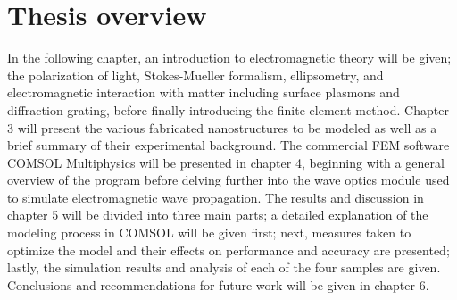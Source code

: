 





\section{Thesis overview}
In the following chapter, an introduction to electromagnetic theory will be given; the polarization of light, Stokes-Mueller formalism, ellipsometry, and electromagnetic interaction with matter including surface plasmons and diffraction grating, before finally introducing the finite element method. Chapter 3 will present the various fabricated nanostructures to be modeled as well as a brief summary of their experimental background. The commercial FEM software COMSOL Multiphysics will be presented in chapter 4, beginning with a general overview of the program before delving further into the wave optics module used to simulate electromagnetic wave propagation. The results and discussion in chapter 5 will be divided into three main parts; a detailed explanation of the modeling process in COMSOL will be given first; next, measures taken to optimize the model and their effects on performance and accuracy are presented; lastly, the simulation results and analysis of each of the four samples are given. Conclusions and recommendations for future work will be given in chapter 6. 




